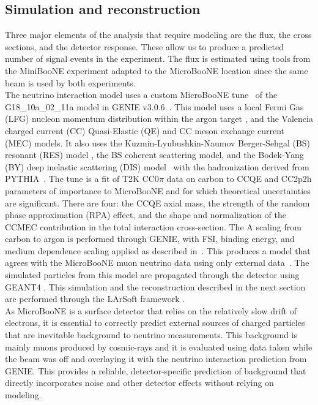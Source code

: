 \documentclass[amsmath,amssymb,aps,prd,showpacs,twocolumn,superscriptaddress,letterpaper,longbibliography, floatfix]{revtex4-2}
\begin{document}
\subsection{Simulation and reconstruction}
\label{sec:F&I}
Three major elements of the analysis that require modeling are the flux, the cross sections, and the detector response.  These allow us to produce a predicted number of signal events in the experiment. 
The flux is estimated using tools from the MiniBooNE experiment \cite{MiniBooNEFlux,UBBNBFlux} adapted to the MicroBooNE location 
since the same beam is used by both experiments.\\

The neutrino interaction model uses a custom MicroBooNE tune~\cite{TuneUB} of the G18\_10a\_02\_11a model in GENIE v3.0.6~\cite{GENIE,Geniev3}.
This model uses a local Fermi Gas (LFG) nucleon momentum distribution within the argon target \cite{LFG}, and the Valencia charged current (CC) Quasi-Elastic (QE)  \cite{CCNieves} and CC meson exchange current (MEC) \cite{2p2hNieves} models. 
It also uses the Kuzmin-Lyubushkin-Naumov Berger-Sehgal (BS) resonant (RES) model \cite{4MomMiniBooNE,BergerSehgal2007,LepPOL,QuarkRES}, the BS coherent \cite{BSCOH} scattering model, and the Bodek-Yang (BY) deep inelastic scattering (DIS) model~\cite{BYDIS} with the hadronization derived from PYTHIA~\cite{PYTHIA}. The tune is a fit of T2K CC0$\pi$ data on carbon to CCQE and CC2p2h parameters of importance to MicroBooNE and for which theoretical uncertainties are significant. There are four: the CCQE axial mass, the strength of the random phase approximation (RPA) effect, and the shape and normalization of the CCMEC contribution in the total interaction cross-section. 
The A scaling from carbon to argon is performed through GENIE, with FSI, binding energy, and medium dependence scaling applied as described in~\cite{TuneUB}.
This produces a model that agrees with the MicroBooNE muon neutrino data using only external data~\cite{TuneUB}. The simulated particles from this model are propagated through the detector using GEANT4 \cite{GEANT4}. This simulation and the reconstruction described in the next section are performed through the LArSoft framework \cite{LArSoft}.\\ 

As MicroBooNE is a surface detector that relies on the relatively slow drift of electrons, it is essential to correctly predict external sources of charged particles that are inevitable background to neutrino measurements. This background is mainly muons produced by cosmic-rays and it is evaluated using data taken while the beam was off and overlaying it with the neutrino interaction prediction from GENIE.
This provides a reliable, detector-specific prediction of background that directly incorporates noise and other detector effects without relying on modeling. \\
\end{document}
